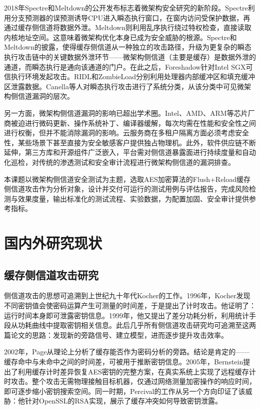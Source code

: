 2018年Spectre\cite{Kocher2019}和Meltdown\cite{Lipp2018}的公开发布标志着微架构安全研究的新阶段。Spectre利用分支预测器的误预测诱导CPU进入瞬态执行窗口，在窗内访问受保护数据，再通过缓存侧信道将数据外泄。Meltdown则利用乱序执行绕过特权检查，直接读取内核地址空间。这意味着微架构优化本身已成为安全威胁的根源。Spectre和Meltdown的披露，使得缓存侧信道从一种独立的攻击路径，升级为更复杂的瞬态执行攻击链中的关键数据外泄环节——微架构侧信道（主要是缓存）是数据外泄的通道，而瞬态执行是通向该通道的门户。在此之后，Foreshadow\cite{Bulck2018}针对Intel SGX可信执行环境发起攻击。RIDL\cite{VanSchaik2019}和ZombieLoad\cite{Schwarz2019}分别利用处理器内部缓冲区和填充缓冲区泄露数据。Canella等人对瞬态执行攻击进行了系统分类\cite{Canella2019}，从该分类中可见微架构侧信道漏洞的层次。

另一方面，微架构侧信道漏洞的影响已超出学术圈。Intel、AMD、ARM等芯片厂商被迫进行微码更新、操作系统补丁、编译器缓解，每次均需在性能和安全性之间进行权衡，但并不能消除漏洞的影响。云服务商在多租户隔离方面必须考虑安全性，某些场景下甚至直接为安全敏感客户提供独占物理机。此外，软件供应链不断延伸，第三方库和开源组件广泛嵌入，平台需对侧信道暴露面进行持续度量和自动化巡检，对传统的渗透测试和安全审计流程进行微架构侧信道的漏洞排查。

本课题以微架构侧信道安全测试为主题，选取AES加密算法的Flush+Reload缓存侧信道攻击作为分析对象，设计并交付可运行的测试用例与评估报告，完成风险检测与效果度量，输出标准化的测试流程、实验数据，为配置加固、安全审计提供参考指标。

\section{国内外研究现状}

\subsection{缓存侧信道攻击研究}

侧信道攻击的思想可追溯到上世纪九十年代Kocher的工作。1996年，Kocher发现不同密钥值会使密码运算产生可测量的时间差，于是提出了计时攻击\cite{Kocher1996}。他证明了：运行时间本身即可泄露密钥信息。1999年，他又提出了差分功耗分析\cite{Kocher1999}，利用统计手段从功耗曲线中提取密钥相关信息。此后几乎所有侧信道攻击研究均可追溯至这两篇论文的思路：发现新的旁路信号、建立模型，进而逐步提升攻击效率。

2002年，Page从理论上分析了缓存能否作为密码分析的旁路\cite{Page2002}。结论是肯定的——缓存命中与未命中之间的时间差，可被用于推断密钥信息。2005年，Bernstein提出了利用缓存计时差异恢复AES密钥的完整方案\cite{Bernstein2005}，在真实系统上实现了远程缓存计时攻击。整个攻击无需物理接触目标机器，仅通过网络测量加密操作的响应时间，即可逐步缩小密钥搜索空间。同一时期，Percival的工作\cite{Percival2005}从另一个方向印证了该威胁：他针对OpenSSL的RSA实现，展示了缓存冲突如何导致密钥泄露。

